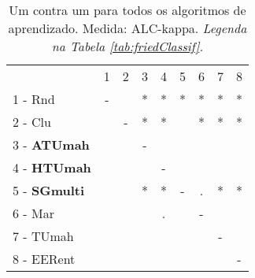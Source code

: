 \begin{table}[h]
\caption{Um contra um para todos os algoritmos de aprendizado. Medida: ALC-kappa. \textit{Legenda na Tabela \ref{tab:friedClassif}.}}
\begin{center}\begin{tabular}{lcc|cc|cc|cc}
 			& 1 & 2 & 3 & 4 & 5 & 6 & 7 & 8\\
1 - Rnd  	& - &   & * & * & * & * & * & * \\
2 - Clu  	&   & - & * & * &   & * & * & * \\ \hline
3 - \textbf{ATUmah}	&   &   & - &   &   &   &   &   \\
4 - \textbf{HTUmah}	&   &   &   & - &   &   &   &   \\ \hline
5 - \textbf{SGmulti}	&   &   & * & * & - & . & * & * \\
6 - Mar  	&   &   &   & . &   & - &   &   \\ \hline
7 - TUmah	&   &   &   &   &   &   & - &   \\
8 - EERent	&   &   &   &   &   &   &   & - \\ \hline\end{tabular}
\label{stratsALCKappaFriedAllReduxall}
\end{center}
\end{table}